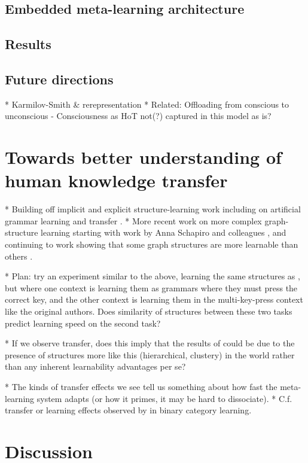 \documentclass[11pt]{article}
\begin{document}
\subsection{Embedded meta-learning architecture}

\subsection{Results}

\subsection{Future directions}

* Karmilov-Smith \& rerepresentation
* Related: Offloading from conscious to unconscious
    - Consciousness as HoT not(?) captured in this model as is?


\section{Towards better understanding of human knowledge transfer}

* Building off implicit and explicit structure-learning work including on artificial grammar learning and transfer \citet{Cleeremans1991, Tunney2001}. 
* More recent work on more complex graph-structure learning starting with work by Anna Schapiro and colleagues \citep{Schapiro2013}, and continuing to work showing that some graph structures are more learnable than others \citep{Kahn2018}.

* Plan: try an experiment similar to the above, learning the same structures as \citet{Kahn2018}, but where one context is learning them as grammars where they must press the correct key, and the other context is learning them in the multi-key-press context like the original authors. Does similarity of structures between these two tasks predict learning speed on the second task?

* If we observe transfer, does this imply that the results of \citet{Kahn2018} could be due to the presence of structures more like this (hierarchical, clustery) in the world rather than any inherent learnability advantages per se?

* The kinds of transfer effects we see tell us something about how fast the meta-learning system adapts (or how it primes, it may be hard to dissociate). 
* C.f. transfer or learning effects observed by \citet{Bourne1970} in binary category learning. 

\section{Discussion}
\end{document}
